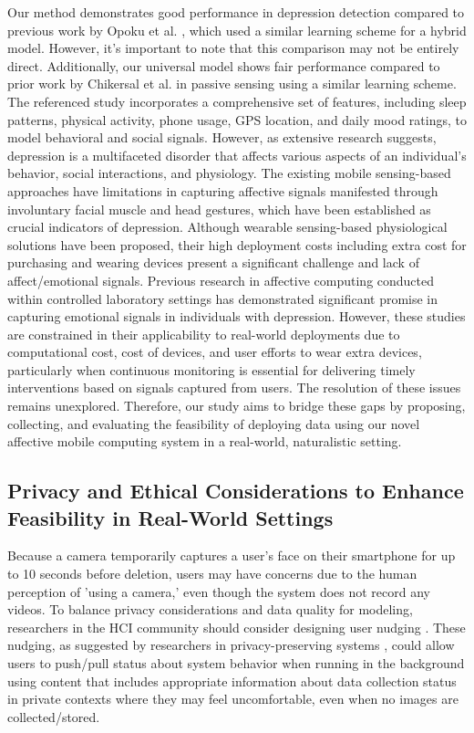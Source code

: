 Our method demonstrates good performance in depression detection compared to previous work by Opoku et al. \cite{opoku2022mood}, which used a similar learning scheme for a hybrid model. However, it's important to note that this comparison may not be entirely direct. Additionally, our universal model shows fair performance compared to prior work by Chikersal et al. \cite{chikersal2021detecting} in passive sensing using a similar learning scheme. The referenced study incorporates a comprehensive set of features, including sleep patterns, physical activity, phone usage, GPS location, and daily mood ratings, to model behavioral and social signals. However, as extensive research suggests, depression is a multifaceted disorder that affects various aspects of an individual's behavior, social interactions, and physiology. The existing mobile sensing-based approaches \cite{opoku2022mood, chikersal2021detecting, farhan2016behavior} have limitations in capturing affective signals \cite{abdullah2018sensing} manifested through involuntary facial muscle and head gestures, which have been established as crucial indicators of depression. Although wearable sensing-based physiological solutions have been proposed, their high deployment costs including extra cost for purchasing and wearing devices present a significant challenge and lack of affect/emotional signals. Previous research in affective computing conducted within controlled laboratory settings \cite{cohn2009detecting, valstar2013avec, song2020spectral, kong2022automatic, casado2023depression} has demonstrated significant promise in capturing emotional signals in individuals with depression. However, these studies are constrained in their applicability to real-world deployments due to computational cost, cost of devices, and user efforts to wear extra devices, particularly when continuous monitoring is essential for delivering timely interventions based on signals captured from users. The resolution of these issues remains unexplored. Therefore, our study aims to bridge these gaps by proposing, collecting, and evaluating the feasibility of deploying data using our novel affective mobile computing system in a real-world, naturalistic setting.


\subsection{Privacy and Ethical Considerations to Enhance Feasibility in Real-World Settings}
Because a camera temporarily captures a user's face on their smartphone for up to 10 seconds before deletion, users may have concerns due to the human perception of 'using a camera,' even though the system does not record any videos. To balance privacy considerations and data quality for modeling, researchers in the HCI community should consider designing user nudging \cite{balebako2014improving, felt2012ve}. These nudging, as suggested by researchers in privacy-preserving systems \cite{denning2014situ}, could allow users to push/pull status about system behavior when running in the background using content that includes appropriate information about data collection status in private contexts where they may feel uncomfortable, even when no images are collected/stored. 

